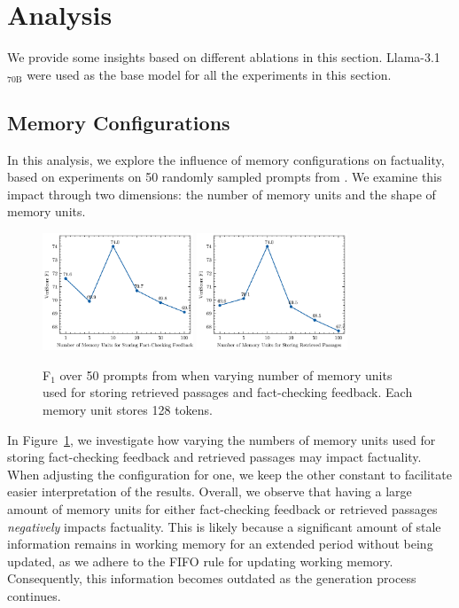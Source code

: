 \section{Analysis}
\label{sec:analysis}

We provide some insights based on different ablations in this section. 
Llama-3.1$_{\text{70B}}$ were used as the base model for all the experiments in this section.


\subsection{Memory Configurations}



In this analysis, we explore the influence of memory configurations on factuality, based on experiments on 50 randomly sampled prompts from \lf. We examine this impact through two dimensions: the number of memory units and the shape of memory units.


\begin{figure}
\centering
\includegraphics[width=0.4\textwidth]{figures/factcheck_memory_config_ablation.png}
\includegraphics[width=0.4\textwidth]{figures/retrieval_memory_config_ablation.png}
    \caption{\vs F$_1$ over 50 prompts from \lf when varying number of memory units used for storing retrieved passages and fact-checking feedback. Each memory unit stores 128 tokens.}
    \label{fig:memory_unit_number_ablation}
\end{figure}

In Figure~\ref{fig:memory_unit_number_ablation}, we investigate how varying the numbers of memory units used for storing fact-checking feedback and retrieved passages may impact factuality. When adjusting the configuration for one, we keep the other constant to facilitate easier interpretation of the results. Overall, we observe that having a large amount of memory units for either fact-checking feedback or retrieved passages \textit{negatively} impacts factuality. 
This is likely because a significant amount of stale information remains in working memory for an extended period without being updated, as we adhere to the FIFO rule for updating working memory. 
Consequently, this information becomes outdated as the generation process continues.



